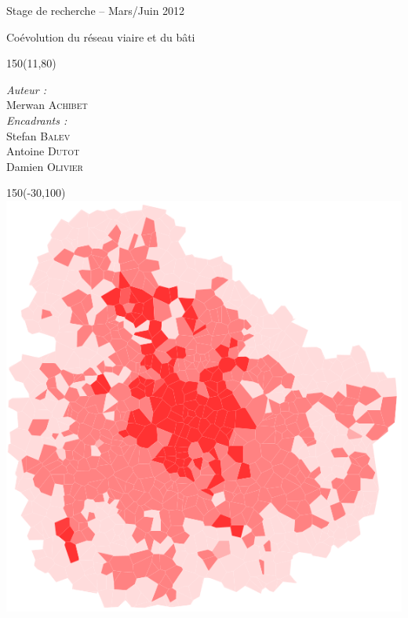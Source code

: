\documentclass[10pt]{article}
\newenvironment{changemargin}[2]{
  \begin{list}{}{
      \setlength{\topsep}{0pt}
      \setlength{\leftmargin}{#1}
      \setlength{\rightmargin}{#2}
      \setlength{\listparindent}{\parindent}
      \setlength{\itemindent}{\parindent}
      \setlength{\parsep}{\parskip}
    }
  \item[]}{\end{list}
}
\begin{document}
\begin{titlepage}

  \begin{changemargin}{-0.3cm}{-0.3cm}

    \begin{flushleft}
      Stage de recherche -- Mars/Juin 2012
    \end{flushleft}

    \vphantom{a}
    \vphantom{a}

    \begin{center}
      {\sffamily \huge Coévolution du réseau viaire et du bâti}
    \end{center}

    \vphantom{a}
    \vphantom{a}

    \begin{textblock}{150}(11,80)
      \begin{flushright}
        \textit{Auteur :}\\
        Merwan {\scshape Achibet}\\[0.5cm]
        \textit{Encadrants :}\\
        Stefan {\scshape Balev}\\
        Antoine {\scshape Dutot}\\
        Damien {\scshape Olivier}
      \end{flushright}
    \end{textblock}

    \vfill

    \begin{textblock}{150}(-30,100)
      \includegraphics[]{images/cover.png}
    \end{textblock}

  \end{changemargin}

\end{titlepage}
\end{document}
